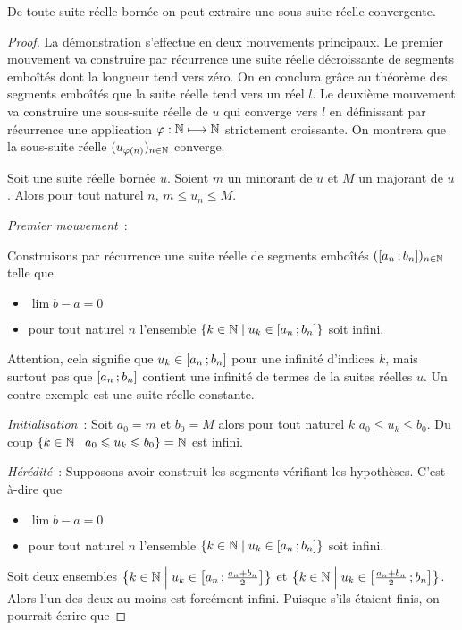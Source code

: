 \begin{theo}
  De toute suite réelle bornée on peut extraire une sous-suite réelle convergente.
\end{theo}
\begin{proof}
 La démonstration s'effectue en deux mouvements principaux. Le premier mouvement va construire par récurrence une suite réelle décroissante de segments emboîtés dont la longueur tend vers zéro. On en conclura grâce au théorème des segments emboîtés que la suite réelle tend vers un réel $l$. Le deuxième mouvement va construire une sous-suite réelle de $u$ qui converge vers $l$ en définissant par récurrence une application $\varphi : \mathbb{N} \longmapsto \mathbb{N}$ strictement croissante. On montrera que la sous-suite réelle $(u_{\varphi(n)})_{n \in \mathbb{N}}$ converge.

 Soit une suite réelle bornée $u$. Soient $m$ un minorant de $u$ et $M$ un majorant de $u$. Alors pour tout naturel $n$, $m \leqslant u_n \leqslant M$.

\emph{Premier mouvement}~:

Construisons par récurrence une suite réelle de segments emboîtés $(\left[ a_n \, ;  b_n \right])_{n \in \mathbb{N}}$ telle que
\begin{itemize}
\item $\lim b-a =0$
\item pour tout naturel $n$ l'ensemble $\left\{k \in \mathbb{N}\mathrel{}\middle|\mathrel{}u_k \in \left[ a_n \, ;  b_n \right]\right\}$ soit infini.
\end{itemize}

Attention, cela signifie que $u_k \in \left[ a_n \, ;  b_n \right]$ pour une infinité d'indices $k$, mais surtout pas que $\left[ a_n \, ;  b_n \right]$ contient une infinité de termes de la suites réelles $u$. Un contre exemple est une suite réelle constante.

\emph{Initialisation}~: Soit $a_0=m$ et $b_0=M$ alors pour tout naturel $k$ $a_0 \leqslant u_k \leqslant b_0$. Du coup $\left\{k \in \mathbb{N}\mathrel{}\middle|\mathrel{}a_0 \leqslant u_k \leqslant b_0\right\}=\mathbb{N}$ est infini.

\emph{Hérédité}~: Supposons avoir construit les segments vérifiant les hypothèses. C'est-à-dire que
\begin{itemize}
\item $\lim b-a =0$
\item pour tout naturel $n$ l'ensemble $\left\{k \in \mathbb{N}\mathrel{}\middle|\mathrel{}u_k \in \left[ a_n \, ;  b_n \right]\right\}$ soit infini.
\end{itemize}

Soit deux ensembles $\left\{k \in \mathbb{N}\mathrel{}\middle|\mathrel{}u_k \in \left[ a_n \, ;  \frac{a_n+b_n}{2} \right]\right\}$ et $\left\{k \in \mathbb{N}\mathrel{}\middle|\mathrel{}u_k \in \left[ \frac{a_n+b_n}{2} \, ;  b_n \right]\right\}$. Alors l'un des deux au moins est forcément infini. Puisque s'ils étaient finis, on pourrait écrire que


\end{proof}
